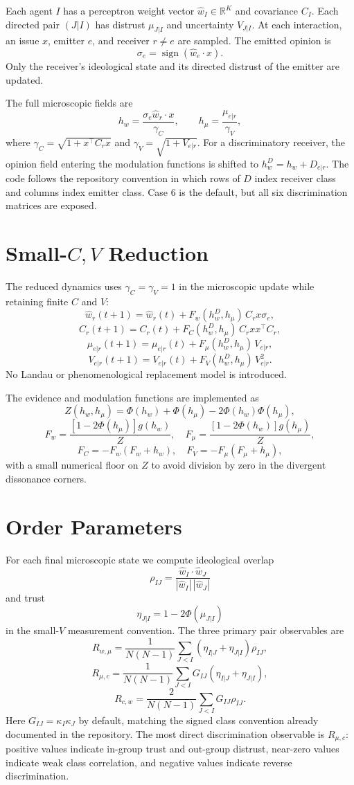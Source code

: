 \documentclass{article}
\newcommand{\Rwm}{R_{w,\mu}}
\newcommand{\Rmc}{R_{\mu,c}}
\newcommand{\Rcw}{R_{c,w}}
\newcommand{\hmu}{h_\mu}
\newcommand{\hw}{h_w}
\newcommand{\PhiG}{\Phi}
\begin{document}
Each agent $I$ has a perceptron weight vector $\hat w_I\in\mathbb R^K$ and
covariance $C_I$.  Each directed pair $(J|I)$ has distrust $\mu_{J|I}$ and
uncertainty $V_{J|I}$.  At each interaction, an issue $x$, emitter $e$, and
receiver $r\ne e$ are sampled.  The emitted opinion is
\[
  \sigma_e = \operatorname{sign}(\hat w_e\cdot x).
\]
Only the receiver's ideological state and its directed distrust of the emitter
are updated.

The full microscopic fields are
\[
  \hw = \frac{\sigma_e \hat w_r\cdot x}{\gamma_C},
  \qquad
  \hmu = \frac{\mu_{e|r}}{\gamma_V},
\]
where $\gamma_C=\sqrt{1+x^\top C_rx}$ and $\gamma_V=\sqrt{1+V_{e|r}}$.
For a discriminatory receiver, the opinion field entering the modulation
functions is shifted to $\hw^D=\hw+D_{e|r}$.  The code follows the repository
convention in which rows of $D$ index receiver class and columns index emitter
class.  Case 6 is the default, but all six discrimination matrices are exposed.

\section{Small-\texorpdfstring{$C,V$}{C,V} Reduction}

The reduced dynamics uses $\gamma_C=\gamma_V=1$ in the microscopic update while
retaining finite $C$ and $V$:
\[
  \hat w_r(t+1) = \hat w_r(t)
  + F_w(\hw^D,\hmu)\, C_rx\sigma_e,
\]
\[
  C_r(t+1) = C_r(t)
  + F_C(\hw^D,\hmu)\, C_rxx^\top C_r,
\]
\[
  \mu_{e|r}(t+1) = \mu_{e|r}(t)
  + F_\mu(\hw^D,\hmu)\, V_{e|r},
\]
\[
  V_{e|r}(t+1) = V_{e|r}(t)
  + F_V(\hw^D,\hmu)\, V_{e|r}^2.
\]
No Landau or phenomenological replacement model is introduced.

The evidence and modulation functions are implemented as
\[
  Z(\hw,\hmu)=\PhiG(\hw)+\PhiG(\hmu)-2\PhiG(\hw)\PhiG(\hmu),
\]
\[
  F_w = \frac{[1-2\PhiG(\hmu)]g(\hw)}{Z},
  \quad
  F_\mu = \frac{[1-2\PhiG(\hw)]g(\hmu)}{Z},
\]
\[
  F_C = -F_w(F_w+\hw),
  \quad
  F_V = -F_\mu(F_\mu+\hmu),
\]
with a small numerical floor on $Z$ to avoid division by zero in the divergent
dissonance corners.

\section{Order Parameters}

For each final microscopic state we compute ideological overlap
\[
  \rho_{IJ} =
  \frac{\hat w_I\cdot\hat w_J}{|\hat w_I|\,|\hat w_J|}
\]
and trust
\[
  \eta_{J|I}=1-2\PhiG(\mu_{J|I})
\]
in the small-$V$ measurement convention.  The three primary pair observables are
\[
  \Rwm =
  \frac{1}{N(N-1)}
  \sum_{J<I}(\eta_{I|J}+\eta_{J|I})\rho_{IJ},
\]
\[
  \Rmc =
  \frac{1}{N(N-1)}
  \sum_{J<I}G_{IJ}(\eta_{I|J}+\eta_{J|I}),
\]
\[
  \Rcw =
  \frac{2}{N(N-1)}
  \sum_{J<I}G_{IJ}\rho_{IJ}.
\]
Here $G_{IJ}=\kappa_I\kappa_J$ by default, matching the signed class convention
already documented in the repository.  The most direct discrimination
observable is $\Rmc$: positive values indicate in-group trust and out-group
distrust, near-zero values indicate weak class correlation, and negative values
indicate reverse discrimination.
\end{document}
